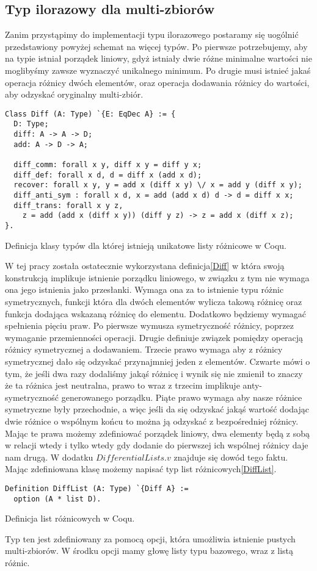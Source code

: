 \subsection{Typ ilorazowy dla multi-zbiorów}
Zanim przystąpimy do implementacji typu ilorazowego postaramy się uogólnić przedstawiony powyżej schemat na więcej typów. Po pierwsze potrzebujemy, aby na typie istniał porządek liniowy, gdyż istniały dwie różne minimalne wartości nie moglibyśmy zawsze wyznaczyć unikalnego minimum. Po drugie musi istnieć jakaś operacja różnicy dwóch elementów, oraz operacja dodawania różnicy do wartości, aby odzyskać oryginalny multi-zbiór.
\begin{code}
\begin{verbatim}
Class Diff (A: Type) `{E: EqDec A} := {
  D: Type;
  diff: A -> A -> D;
  add: A -> D -> A;

  diff_comm: forall x y, diff x y = diff y x;
  diff_def: forall x d, d = diff x (add x d);
  recover: forall x y, y = add x (diff x y) \/ x = add y (diff x y);
  diff_anti_sym : forall x d, x = add (add x d) d -> d = diff x x;
  diff_trans: forall x y z, 
    z = add (add x (diff x y)) (diff y z) -> z = add x (diff x z);
}.
\end{verbatim}
\caption{Definicja klasy typów dla której istnieją unikatowe listy różnicowe w Coqu.}
\label{Diff}
\end{code}
W tej pracy została ostatecznie wykorzystana definicja\ref{Diff} w która swoją konstrukcją implikuje istnienie porządku liniowego, w związku z tym nie wymaga ona jego istnienia jako przesłanki. Wymaga ona za to istnienie typu różnic symetrycznych, funkcji która dla dwóch elementów wylicza takową różnicę oraz funkcja dodająca wskazaną różnicę do elementu. Dodatkowo będziemy wymagać spełnienia pięciu praw. Po pierwsze wymusza symetryczność różnicy, poprzez wymaganie przemienności operacji. Drugie definiuje związek pomiędzy operacją różnicy symetrycznej a dodawaniem. Trzecie prawo wymaga aby z różnicy symetrycznej dało się odzyskać przynajmniej jeden z elementów. Czwarte mówi o tym, że jeśli dwa razy dodaliśmy jakąś różnicę i wynik się nie zmienił to znaczy że ta różnica jest neutralna, prawo to wraz z trzecim implikuje anty-symetryczność generowanego porządku. Piąte prawo wymaga aby nasze różnice symetryczne były przechodnie, a więc jeśli da się odzyskać jakąś wartość dodając dwie różnice o wspólnym końcu to można ją odzyskać z bezpośredniej różnicy. Mając te prawa możemy zdefiniować porządek liniowy, dwa elementy będą z sobą w relacji wtedy i tylko wtedy gdy dodanie do pierwszej ich wspólnej różnicy daje nam drugą. W dodatku $DifferentialLists.v$ znajduje się dowód tego faktu. Mając zdefiniowana klasę możemy napisać typ list różnicowych\ref{DiffList}.
\begin{code}
\begin{verbatim}
Definition DiffList (A: Type) `{Diff A} :=
  option (A * list D).
\end{verbatim}
\caption{Definicja list różnicowych w Coqu.}
\label{DiffList}
\end{code}
Typ ten jest zdefiniowany za pomocą opcji, która umożliwia istnienie pustych multi-zbiorów. W środku opcji mamy głowę listy typu bazowego, wraz z listą różnic.

